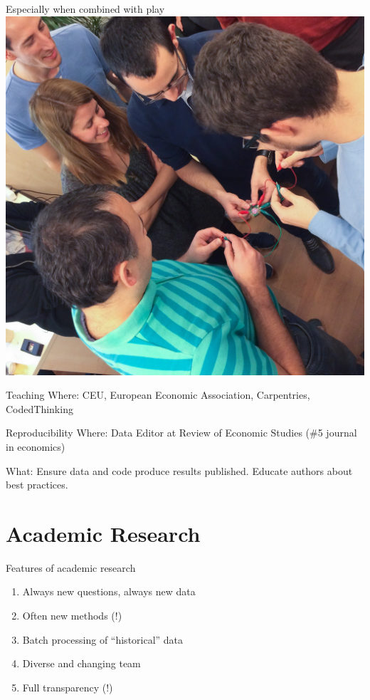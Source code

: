 \documentclass[
  ignorenonframetext,
  aspectratio=54,
]{beamer}
\providecommand{\tightlist}{%
  \setlength{\itemsep}{0pt}\setlength{\parskip}{0pt}}
\begin{document}
\begin{frame}{Especially when combined with play}
\protect\hypertarget{especially-when-combined-with-play}{}
\includegraphics{assets/img/codebug.jpg}
\end{frame}

\begin{frame}{Teaching}
\protect\hypertarget{teaching}{}
Where: CEU, European Economic Association, Carpentries, CodedThinking
\end{frame}

\begin{frame}{Reproducibility}
\protect\hypertarget{reproducibility}{}
Where: Data Editor at Review of Economic Studies (\#5 journal in
economics)

What: Ensure data and code produce results published. Educate authors
about best practices.
\end{frame}

\hypertarget{academic-research}{%
\section{Academic Research}\label{academic-research}}

\begin{frame}{Features of academic research}
\protect\hypertarget{features-of-academic-research}{}
\begin{enumerate}
\tightlist
\item
  Always new questions, always new data
\item
  Often new methods (!)
\item
  Batch processing of ``historical'' data
\item
  Diverse and changing team
\item
  Full transparency (!)
\end{enumerate}
\end{frame}
\end{document}

